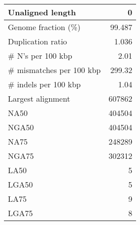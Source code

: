 \documentclass[12pt,a4paper]{article}
\begin{document}
\begin{table}[ht]
\begin{center}
\begin{tabular}{|l*{1}{|r}|}
Unaligned length & 0 \\ \hline
Genome fraction (\%) & 99.487 \\ \hline
Duplication ratio & 1.036 \\ \hline
\# N's per 100 kbp & 2.01 \\ \hline
\# mismatches per 100 kbp & 299.32 \\ \hline
\# indels per 100 kbp & 1.04 \\ \hline
Largest alignment & 607862 \\ \hline
NA50 & 404504 \\ \hline
NGA50 & 404504 \\ \hline
NA75 & 248289 \\ \hline
NGA75 & 302312 \\ \hline
LA50 & 5 \\ \hline
LGA50 & 5 \\ \hline
LA75 & 9 \\ \hline
LGA75 & 8 \\ \hline
\end{tabular}
\end{center}
\end{table}
\end{document}
